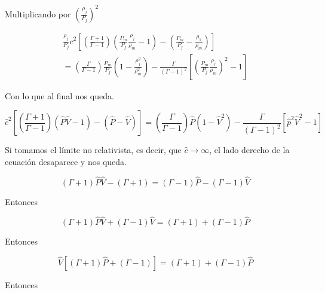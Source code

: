 \documentclass[12pt,a4paper]{book}
\begin{document}
Multiplicando por $\left( \frac{\rho_j}{P_j}\right)^2$

\begin{eqnarray}
\frac { \rho _ { j } } { P _ { j } } c ^ { 2 } \left[ \left( \frac { \Gamma + 1 } { \Gamma - 1 } \right) \left( \frac { P _ { m } } { P _ { j } } \frac { \rho _ { j } } { \rho _ { m } } - 1 \right) - \left( \frac { P _ { m } } { P _ { j } } - \frac { \rho _ { 1 } } { \rho _ { m } } \right) \right] \nonumber \\
=\left( \frac { \Gamma } { \Gamma - 1 } \right) \frac { P _ { m } } { P _ { j } } \left( 1 - \frac { \rho _ { j } ^ { 2 } } { \rho _ { m } ^ { 2 } } \right) - \frac { \Gamma } { ( \Gamma - 1 ) ^ { 2 } } \left[ \left( \frac { P _ { m } } { P _ { j } } \frac { \rho _ { j } } { \rho _ { m } } \right) ^ { 2 } - 1 \right]
\end{eqnarray}

Con lo que al final nos queda.

\begin{equation} \label{ecuacion_RH}
\hat { c } ^ { 2 } \left[ \left( \frac { \Gamma + 1 } { \Gamma - 1 } \right) ( \hat { P } \hat { V } - 1 ) - ( \hat { P } - \hat { V } ) \right] =
\left( \frac { \Gamma } { \Gamma - 1 } \right) \hat { P } \left( 1 - \hat { V } ^ { 2 } \right) - \frac { \Gamma } { ( \Gamma - 1 ) ^ { 2 } } \left[ \hat { p } ^ { 2 } \hat { V } ^ { 2 } - 1 \right]
\end{equation}

Si tomamos el límite no relativista, es decir, que $\hat{c} \longrightarrow \infty$, el lado derecho de la ecuación desaparece y nos queda.

\begin{equation*}
( \Gamma + 1 ) \hat{P} \hat { V } - ( \Gamma + 1 ) = ( \Gamma - 1 ) \hat { P } - ( \Gamma - 1 ) \hat { V }
\end{equation*}

Entonces

\begin{equation*}
( \Gamma + 1 ) \hat { P } \hat { V } + ( \Gamma - 1 ) \hat { V } = ( \Gamma + 1 ) + ( \Gamma - 1 ) \hat { P }
\end{equation*}

Entonces

\begin{equation*}
\hat { V } [ ( \Gamma + 1 ) \hat { P } + ( \Gamma - 1 ) ] = ( \Gamma + 1 ) + ( \Gamma - 1 ) \hat { P }
\end{equation*}

Entonces
\end{document}
